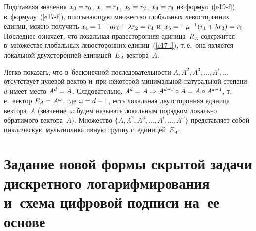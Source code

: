 \begin{multicols}{2}
  Подставляя значения $x_0\hm=r_0$, $x_1\hm=r_1$, $x_2\hm=r_2$, 
$x_3\hm=r_3$ из формул~(\ref{e19-f}) в~формулу~(\ref{e17-f}), описывающую 
множество глобальных левосторонних единиц, можно получить $x_4\hm= 
1\hm- \mu r_0 \hm- \lambda r_2\hm=r_4$ и~$x_5\hm= -\mu^{-1} (r_1\hm+ \lambda 
r_3)\hm=r_5$ Последнее означает, что локальная правосторонняя 
единица~$R_A$ содержится в~множестве глобальных левосторонних 
единиц~(\ref{e17-f}), т.\,е.\ она является локальной двухсторонней 
единицей~$E_A$ вектора~$A$. 
  
  Легко показать, что в~бесконечной последовательности $A, A^2, A^3, \ldots , 
A^i,\ldots$ отсутствует нулевой вектор и~при некоторой минимальной 
натуральной степени~$d$ имеет место $A^d\hm= A$. Следовательно, $A^d\hm= 
A\hm\Rightarrow A^{d-1}\circ A\hm= A\circ A^{d-1}$, т.\,е.\ вектор 
$E_A\hm=A^\omega$, где $\omega \hm= d\hm-1$, есть локальная двухсторонняя 
единица вектора~$A$ (значение~$\omega$ будем называть локальным 
порядком локально обратимого вектора~$A$). Множество $\{ A, A^2, A^3, 
\ldots , A^i, \ldots , A^\omega\}$ представляет собой циклическую 
мультипликативную группу с~единицей~$E_A$.
  
\section{Задание новой формы скрытой задачи дискретного логарифмирования
и~схема цифровой подписи  на~ее основе}


\end{multicols}
